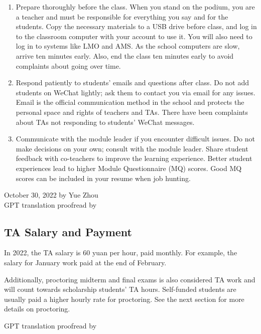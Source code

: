 \begin{enumerate}
    \item Prepare thoroughly before the class. When you stand on the podium, you are a teacher and must be responsible for everything you say and for the students. Copy the necessary materials to a USB drive before class, and log in to the classroom computer with your account to use it. You will also need to log in to systems like LMO and AMS. As the school computers are slow, arrive ten minutes early. Also, end the class ten minutes early to avoid complaints about going over time.
    \item Respond patiently to students’ emails and questions after class. Do not add students on WeChat lightly; ask them to contact you via email for any issues. Email is the official communication method in the school and protects the personal space and rights of teachers and TAs. There have been complaints about TAs not responding to students’ WeChat messages.
    \item Communicate with the module leader if you encounter difficult issues. Do not make decisions on your own; consult with the module leader. Share student feedback with co-teachers to improve the learning experience. Better student experiences lead to higher Module Questionnaire (MQ) scores. Good MQ scores can be included in your resume when job hunting.
\end{enumerate}

\begin{flushright}
    October 30, 2022 by Yue Zhou \\
    GPT translation proofread by \Shiyao
\end{flushright}

\subsection{TA Salary and Payment}
In 2022, the TA salary is 60 yuan per hour, paid monthly.  For example, the salary for January work paid at the end of February.

\emptyline{}
Additionally, proctoring midterm and final exams is also considered TA work and will count towards scholarship students’ TA hours. Self-funded students are usually paid a higher hourly rate for proctoring. See the next section for more details on proctoring.

\begin{flushright}
    GPT translation proofread by \Shiyao
\end{flushright}